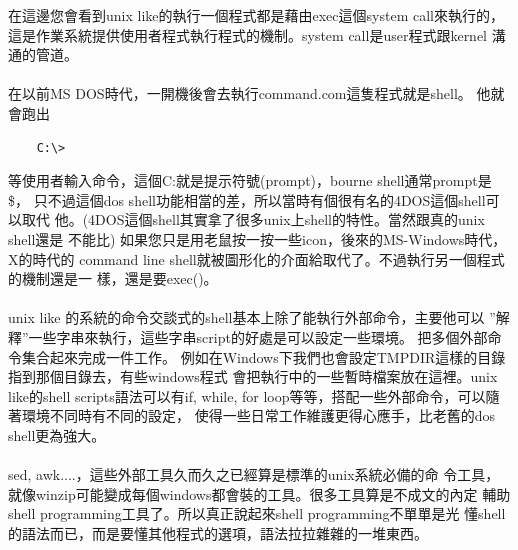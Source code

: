     在這邊您會看到unix like的執行一個程式都是藉由exec這個system call來執行的，
    這是作業系統提供使用者程式執行程式的機制。system call是user程式跟kernel
    溝通的管道。
    \\\\
    在以前MS DOS時代，一開機後會去執行command.com這隻程式就是shell。
    他就會跑出
    \begin{verbatim}
    C:\>
    \end{verbatim}
    等使用者輸入命令，這個C:就是提示符號(prompt)，bourne shell通常prompt是\$，
    只不過這個dos shell功能相當的差，所以當時有個很有名的4DOS這個shell可以取代
    他。(4DOS這個shell其實拿了很多unix上shell的特性。當然跟真的unix shell還是
    不能比) 如果您只是用老鼠按一按一些icon，後來的MS-Windows時代，X的時代的
    command line shell就被圖形化的介面給取代了。不過執行另一個程式的機制還是一
    樣，還是要exec()。
    \\\\
    unix like 的系統的命令交談式的shell基本上除了能執行外部命令，主要他可以
    ''解釋''一些字串來執行，這些字串script的好處是可以設定一些環境。
    把多個外部命令集合起來完成一件工作。
    例如在Windows下我們也會設定TMPDIR這樣的目錄指到那個目錄去，有些windows程式
    會把執行中的一些暫時檔案放在這裡。unix like的shell scripts語法可以有if, 
    while, for loop等等，搭配一些外部命令，可以隨著環境不同時有不同的設定，
    使得一些日常工作維護更得心應手，比老舊的dos shell更為強大。
    \\\\
    sed, awk....，這些外部工具久而久之已經算是標準的unix系統必備的命
    令工具，就像winzip可能變成每個windows都會裝的工具。很多工具算是不成文的內定
    輔助shell programming工具了。所以真正說起來shell programming不單單是光
    懂shell的語法而已，而是要懂其他程式的選項，語法拉拉雜雜的一堆東西。
